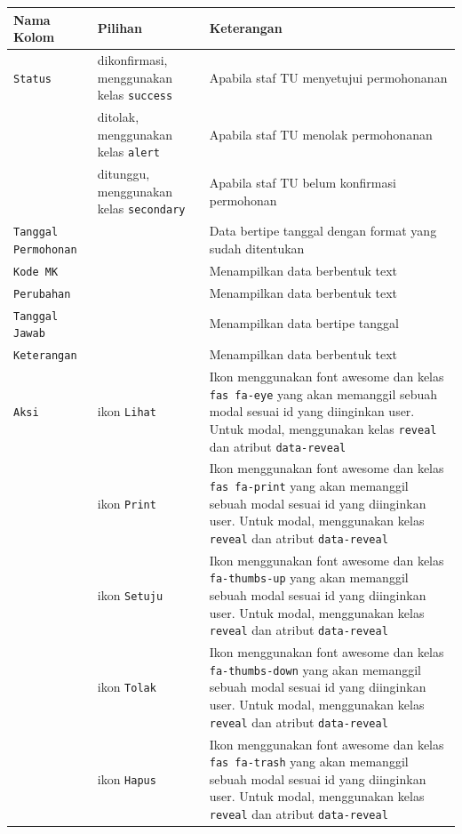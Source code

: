 \documentclass[a4paper,twoside]{article}
\begin{document}
\begin{enumerate}
		\begin{tabular}{|p{4cm}|p{2cm}|p{10cm}|}
			\hline
			Nama Kolom & Pilihan & Keterangan\\
			\hline
			\texttt{Status} & dikonfirmasi, menggunakan kelas \colorbox{mygray}{\texttt{success}} & Apabila staf TU menyetujui permohonanan\\
			\hline
			&  ditolak, menggunakan kelas \colorbox{mygray}{\texttt{alert}}  & Apabila staf TU menolak permohonanan\\
			\hline
			& ditunggu, menggunakan kelas \colorbox{mygray}{\texttt{secondary}} &  Apabila staf TU belum konfirmasi permohonan \\
			\hline
			\texttt{Tanggal Permohonan}    & & Data bertipe tanggal dengan format yang sudah ditentukan\\
			\hline
			\texttt{Kode MK} &  & Menampilkan data berbentuk text \\
			\hline
			\texttt{Perubahan} &  & Menampilkan data berbentuk text \\
			\hline
			\texttt{Tanggal Jawab} &  & Menampilkan data bertipe tanggal \\
			\hline
			\texttt{Keterangan} &  & Menampilkan data berbentuk text \\
			\hline
			\texttt{Aksi} & ikon \texttt{Lihat} & Ikon menggunakan font awesome dan kelas  \colorbox{mygray}{\texttt{fas fa-eye}} yang akan memanggil sebuah modal sesuai id yang diinginkan user. Untuk modal, menggunakan kelas \texttt{reveal} dan atribut \texttt{data-reveal}\\
			\hline
			& ikon \texttt{Print} & Ikon menggunakan font awesome dan kelas  \colorbox{mygray}{\texttt{fas fa-print}} yang akan memanggil sebuah modal sesuai id yang diinginkan user. Untuk modal, menggunakan kelas \texttt{reveal} dan atribut \texttt{data-reveal}\\
			\hline
			& ikon \texttt{Setuju} & Ikon menggunakan font awesome dan kelas  \colorbox{mygray}{\texttt{fa-thumbs-up}} yang akan memanggil sebuah modal sesuai id yang diinginkan user. Untuk modal, menggunakan kelas \texttt{reveal} dan atribut \texttt{data-reveal}\\
			\hline
			& ikon \texttt{Tolak} & Ikon menggunakan font awesome dan kelas  \colorbox{mygray}{\texttt{fa-thumbs-down}} yang akan memanggil sebuah modal sesuai id yang diinginkan user. Untuk modal, menggunakan kelas \texttt{reveal} dan atribut \texttt{data-reveal}\\
			\hline
			& ikon \texttt{Hapus} & Ikon menggunakan font awesome dan kelas  \colorbox{mygray}{\texttt{fas fa-trash}} yang akan memanggil sebuah modal sesuai id yang diinginkan user. Untuk modal, menggunakan kelas \texttt{reveal} dan atribut \texttt{data-reveal}\\	

\end{tabular}
\end{enumerate}
\end{document}

